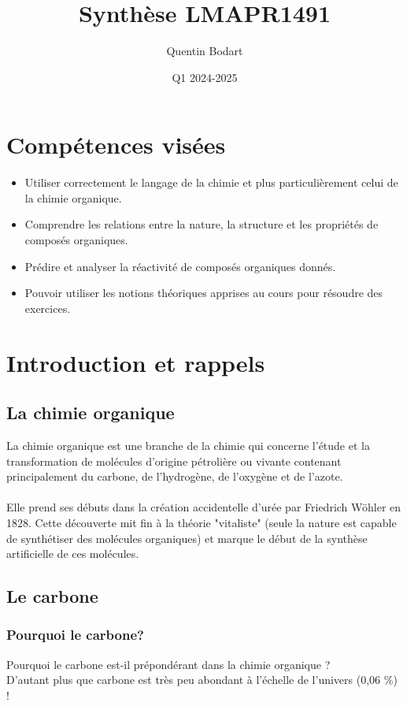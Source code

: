\documentclass{article}
\title{Synthèse LMAPR1491}
\author{Quentin Bodart}
\date{Q1 2024-2025}
\begin{document}
\maketitle
\tableofcontents
\pagebreak

\section*{Compétences visées}
    \begin{itemize}
        \item Utiliser correctement le langage de la chimie et plus
        particulièrement celui de la chimie organique.
        \item Comprendre les relations entre la nature, la
        structure et les propriétés de composés organiques.
        \item Prédire et analyser la réactivité de composés
        organiques donnés.
        \item Pouvoir utiliser les notions théoriques apprises au
        cours pour résoudre des exercices.
    \end{itemize}

\section{Introduction et rappels}
    \subsection{La chimie organique}
        La chimie organique est une branche de la chimie qui concerne
        l’étude et la transformation de molécules d’origine pétrolière ou
        vivante contenant principalement
        du carbone, de l’hydrogène, de l’oxygène et de l’azote.\\\\
        Elle prend ses débuts dans la création accidentelle d'urée par Friedrich Wöhler en 1828.
        Cette découverte mit fin à la théorie "vitaliste" (seule la nature est capable de synthétiser des molécules organiques) 
        et marque le début de la synthèse artificielle de ces molécules.

    \subsection{Le carbone}
        \subsubsection{Pourquoi le carbone?}
            Pourquoi le carbone est-il prépondérant dans la chimie organique ? \\
            D'autant plus que carbone est très peu abondant à l'échelle de l'univers (0,06 \%) !
\end{document}
